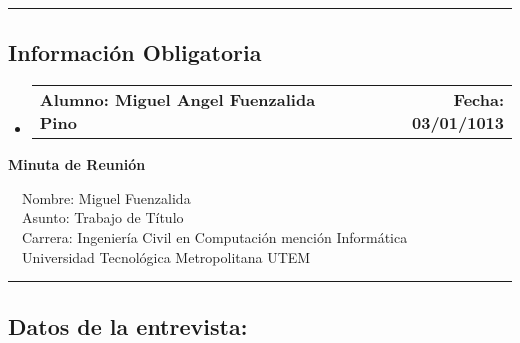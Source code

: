 \documentclass[10pt,letterpaper]{article}
\makeatletter
\newcommand{\headerrow}[2]
{\begin{tabular*}{\linewidth}{l@{\extracolsep{\fill}}r}
	#1 &
	#2 \\
\end{tabular*}}
\makeatother
\begin{document}
\hrule
\vspace{-0.4em}
\subsection*{Información Obligatoria}

\begin{itemize}
	\parskip=0.1em

	\item 
	\headerrow
		{\textbf{Alumno: Miguel Angel Fuenzalida Pino}}
		{\textbf{Fecha: 03/01/1013}}

\end{itemize}
\newpage
\begin{center}
{\LARGE \textbf{Minuta de Reunión}}

\ \ \textbullet Nombre: Miguel Fuenzalida
\\
\ \ \textbullet Asunto: Trabajo de Título
\\
\ \ \textbullet Carrera: Ingeniería Civil en Computación mención Informática
\\
\ \ \textbullet Universidad Tecnológica Metropolitana UTEM
\end{center}

\hrule
\vspace{-0.4em}
\subsection*{Datos de la entrevista:}
\end{document}
